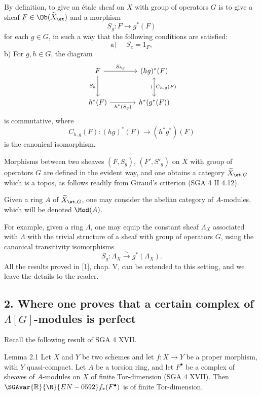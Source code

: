 By definition, to give an étale sheaf on $X$ with group of operators $G$ is to give a sheaf $F\in \Ob(\widetilde X_{\et})$ and a morphism
\[
S_g:F\longrightarrow g^*(F)
\]
for each $g\in G$, in such a way that the following conditions are satisfied:
\[
\text{a) }\quad S_e=1_F,
\]
b) For $g,h\in G$, the diagram
\[
\begin{tikzcd}[column sep=large,row sep=large]
F \arrow[r,"S_{hg}"] \arrow[d,"S_h"'] & (hg)^*(F) \arrow[d,leftrightarrow,"\wr"',"C_{h,g}(F)"]\\
h^*(F) \arrow[r,"h^*(S_g)"'] & h^*(g^*(F))
\end{tikzcd}
\]
is commutative, where
\[
C_{h,g}(F):(hg)^*(F)\longrightarrow (h^*g^*)(F)
\]
is the canonical isomorphism.

Morphisms between two sheaves $(F,S_g)$, $(F',S'_g)$ on $X$ with group of operators $G$ are defined in the evident way, and one obtains a category $\widetilde X_{\et,G}$ which is a topos, as follows readily from Giraud's criterion (SGA 4 II 4.12).

Given a ring $A$ of $\widetilde X_{\et,G}$, one may consider the abelian category of $A$-modules, which will be denoted $\Mod(A)$.

For example, given a ring $\Lambda$, one may equip the constant sheaf $\Lambda_X$ associated with $\Lambda$ with the trivial structure of a sheaf with group of operators $G$, using the canonical transitivity isomorphisms
\[
S_g:\Lambda_X\xrightarrow{\sim}g^*(\Lambda_X).
\]
All the results proved in [1], chap. V, can be extended to this setting, and we leave the details to the reader.

\subsection*{2. Where one proves that a certain complex of $\Lambda[G]$-modules is perfect}

Recall the following result of SGA 4 XVII.

\begin{statement}{Lemma 2.1}
Let $X$ and $Y$ be two schemes and let $f:X\to Y$ be a proper morphism, with $Y$ quasi-compact. Let $A$ be a torsion ring, and let $F^\bullet$ be a complex of sheaves of $A$-modules on $X$ of finite Tor-dimension (SGA 4 XVII). Then $\SGAvar{\mathbb{R}}{\R}{EN-0592} f_*(F^\bullet)$ is of finite Tor-dimension.
\end{statement}

